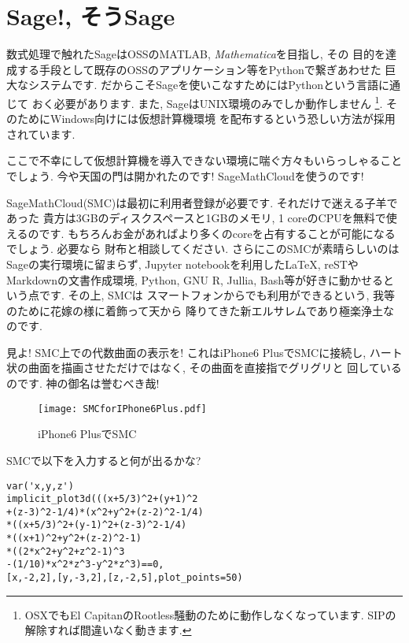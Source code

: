 \documentclass[b5j,8pt,twocolumn]{ltjsarticle}
\begin{document}
\section{Sage!, そうSage}

数式処理で触れたSageはOSSのMATLAB, \textit{Mathematica}を目指し, その
目的を達成する手段として既存のOSSのアプリケーション等をPythonで繋ぎあわせた
巨大なシステムです. だからこそSageを使いこなすためにはPythonという言語に通じて
おく必要があります. また, SageはUNIX環境のみでしか動作しません
\footnote{OSXでもEl CapitanのRootless騒動のために動作しなくなっています.
 SIPの解除すれば間違いなく動きます.}. そのためにWindows向けには仮想計算機環境
を配布するという恐しい方法が採用されています.
\newline

ここで不幸にして仮想計算機を導入できない環境に喘ぐ方々もいらっしゃることでしょう.
 今や天国の門は開かれたのです! SageMathCloudを使うのです!
\newline

SageMathCloud(SMC)は最初に利用者登録が必要です. それだけで迷える子羊であった
貴方は3GBのディスクスペースと1GBのメモリ, 1 coreのCPUを無料で使えるのです.
 もちろんお金があればより多くのcoreを占有することが可能になるでしょう. 必要なら
財布と相談してください. さらにこのSMCが素晴らしいのはSageの実行環境に留まらず,
 Jupyter notebookを利用した{\LaTeX}, reSTやMarkdownの文書作成環境,
 Python, GNU R, Jullia, Bash等が好きに動かせるという点です. その上, SMCは
スマートフォンからでも利用ができるという, 我等のために花嫁の様に着飾って天から
降りてきた新エルサレムであり極楽浄土なのです. 
\newline

見よ! SMC上での代数曲面の表示を! これはiPhone6 PlusでSMCに接続し,
ハート状の曲面を描画させただけではなく, その曲面を直接指でグリグリと
回しているのです. 神の御名は誉むべき哉!

\begin{figure}[htbp]
\begin{center}
\texttt{[image: SMCforIPhone6Plus.pdf]}
\caption{iPhone6 PlusでSMC}
\label{fig:smc4iphone}
\end{center}
\end{figure}

SMCで以下を入力すると何が出るかな?

\begin{lstlisting}[caption=みんなで入れようクマー,
frame=tlRB,numberstyle=\footnotesize,basicstyle=\footnotesize]
var('x,y,z')
implicit_plot3d(((x+5/3)^2+(y+1)^2
+(z-3)^2-1/4)*(x^2+y^2+(z-2)^2-1/4)
*((x+5/3)^2+(y-1)^2+(z-3)^2-1/4)
*((x+1)^2+y^2+(z-2)^2-1)
*((2*x^2+y^2+z^2-1)^3
-(1/10)*x^2*z^3-y^2*z^3)==0, 
[x,-2,2],[y,-3,2],[z,-2,5],plot_points=50)
\end{lstlisting}
\end{document}
